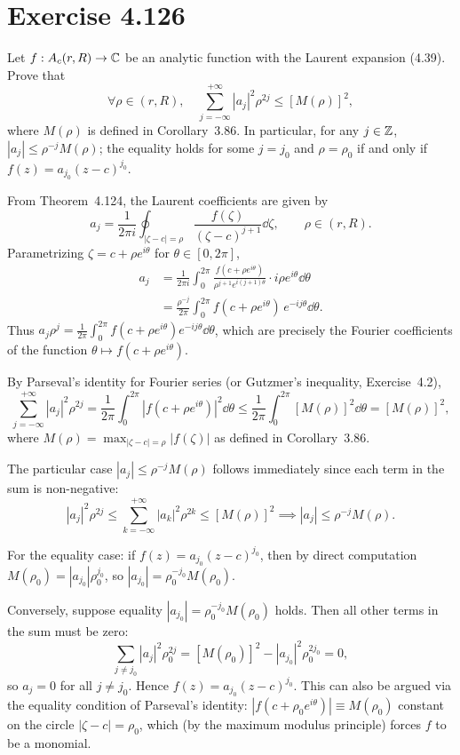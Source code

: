 \documentclass{article}
\begin{document}
\section{Exercise 4.126}

Let $f : A_c(r, R) \to \mathbb{C}$ be an analytic function with the Laurent
expansion (4.39). Prove that
\[
  \forall \rho \in (r, R), \quad
  \sum_{j=-\infty}^{+\infty} |a_j|^2 \rho^{2j} \le [M(\rho)]^2,
\]
where $M(\rho)$ is defined in Corollary~3.86. In particular, for any
$j \in \mathbb{Z}$, $|a_j| \le \rho^{-j} M(\rho)$; the equality holds for some
$j = j_0$ and $\rho = \rho_0$ if and only if $f(z) = a_{j_0}(z-c)^{j_0}$.

\begin{solution}
  From Theorem~4.124, the Laurent coefficients are given by
  \[
    a_j = \frac{1}{2\pi i} \oint_{|\zeta-c|=\rho}
    \frac{f(\zeta)}{(\zeta-c)^{j+1}} \dd\zeta, \qquad \rho \in (r, R).
  \]
  Parametrizing $\zeta = c + \rho e^{i\theta}$ for $\theta \in [0, 2\pi]$,
  \begin{align*}
    a_j &= \frac{1}{2\pi i} \int_{0}^{2\pi}
    \frac{f(c + \rho e^{i\theta})}{\rho^{j+1} e^{i(j+1)\theta}}
    \cdot i\rho e^{i\theta} \dd\theta\\
    &= \frac{\rho^{-j}}{2\pi} \int_{0}^{2\pi}
    f(c + \rho e^{i\theta}) \, e^{-ij\theta} \dd\theta.
  \end{align*}
  Thus $a_j \rho^j = \frac{1}{2\pi} \int_0^{2\pi} f(c + \rho e^{i\theta})
  e^{-ij\theta} \dd\theta$, which are precisely the Fourier coefficients of
  the function $\theta \mapsto f(c + \rho e^{i\theta})$.

  By Parseval's identity for Fourier series (or Gutzmer's inequality,
  Exercise~4.2),
  \[
    \sum_{j=-\infty}^{+\infty} |a_j|^2 \rho^{2j}
    = \frac{1}{2\pi} \int_{0}^{2\pi} |f(c + \rho e^{i\theta})|^2 \dd\theta
    \le \frac{1}{2\pi} \int_{0}^{2\pi} [M(\rho)]^2 \dd\theta
    = [M(\rho)]^2,
  \]
  where $M(\rho) = \max_{|\zeta-c|=\rho} |f(\zeta)|$ as defined in
  Corollary~3.86.

  The particular case $|a_j| \le \rho^{-j} M(\rho)$ follows immediately since
  each term in the sum is non-negative:
  \[
    |a_j|^2 \rho^{2j} \le \sum_{k=-\infty}^{+\infty} |a_k|^2 \rho^{2k}
    \le [M(\rho)]^2 \implies |a_j| \le \rho^{-j} M(\rho).
  \]

  For the equality case: if $f(z) = a_{j_0}(z-c)^{j_0}$, then by direct
  computation $M(\rho_0) = |a_{j_0}| \rho_0^{j_0}$, so
  $|a_{j_0}| = \rho_0^{-j_0} M(\rho_0)$.

  Conversely, suppose equality $|a_{j_0}| = \rho_0^{-j_0} M(\rho_0)$ holds.
  Then all other terms in the sum must be zero:
  \[
    \sum_{j \ne j_0} |a_j|^2 \rho_0^{2j}
    = [M(\rho_0)]^2 - |a_{j_0}|^2 \rho_0^{2j_0} = 0,
  \]
  so $a_j = 0$ for all $j \ne j_0$. Hence $f(z) = a_{j_0}(z-c)^{j_0}$.
  This can also be argued via the equality condition of Parseval's identity:
  $|f(c + \rho_0 e^{i\theta})| \equiv M(\rho_0)$ constant on the circle
  $|\zeta-c| = \rho_0$, which (by the maximum modulus principle) forces
  $f$ to be a monomial.
\end{solution}
\end{document}
